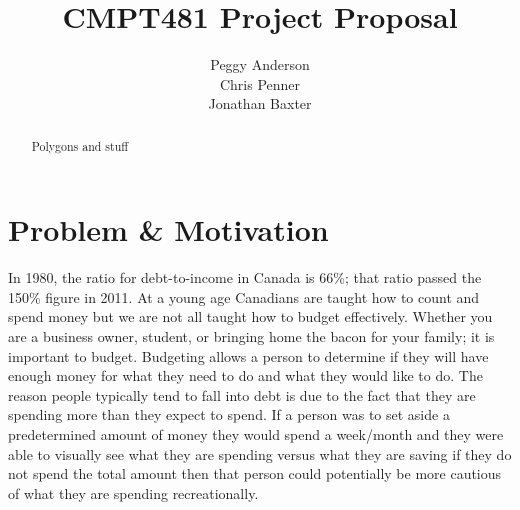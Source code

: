 \documentclass{chi2011}
\begin{document}
\setlength{\paperheight}{11in}
\setlength{\paperwidth}{8.5in}
\setlength{\pdfpageheight}{\paperheight}
\setlength{\pdfpagewidth}{\paperwidth}


\title{CMPT481 Project Proposal}
\author{
\alignauthor Peggy Anderson\\
    \alignauthor Chris Penner\\
    \alignauthor Jonathan Baxter\\
}


\maketitle

\begin{abstract}
    Polygons and stuff
\end{abstract}

\section{Problem \& Motivation}

In 1980, the ratio for debt-to-income in Canada is 66\%; that ratio passed the 150\% figure in 2011. At a young age 
Canadians are taught how to count and spend money but we are not all taught how to budget effectively. Whether you are 
a business owner, student, or bringing home the bacon for your family; it is important to budget. Budgeting allows a 
person to determine if they will have enough money for what they need to do and what they would like to do. The reason
people typically tend to fall into debt is due to the fact that they are spending more than they expect to spend. If a 
person was to set aside a predetermined amount of money they would spend a week/month and they were able to visually see what 
they are spending versus what they are saving if they do not spend the total amount then that person could potentially 
be more cautious of what they are spending recreationally.
\end{document}
